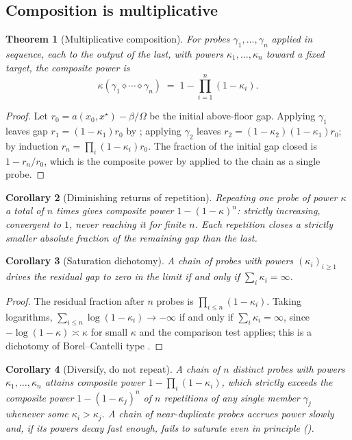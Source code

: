 \documentclass[11pt,twocolumn,a4paper]{article}
\theoremstyle{dirthm}
\newtheorem{theorem}{Theorem}[section]
\newtheorem{corollary}[theorem]{Corollary}
\theoremstyle{definition}
\theoremstyle{remark}
\newcommand{\flo}{\beta}
\newcommand{\al}{a}
\newcommand{\Om}{\Omega}
\newcommand{\pot}{\kappa}
\begin{document}
\subsection{Composition is multiplicative}

\begin{theorem}[Multiplicative composition]
\label{thm:multiplicative}
For probes $\gamma_1,\dots,\gamma_n$ applied in sequence, each to the output
of the last, with powers $\pot_1,\dots,\pot_n$ toward a fixed target, the
composite power is
\[
\pot(\gamma_1\diamond\cdots\diamond\gamma_n)\;=\;1-\prod_{i=1}^{n}(1-\pot_i).
\]
\end{theorem}

\begin{proof}
Let $r_0=\al(x_0,x^{\star})-\flo/\Om$ be the initial above-floor gap.
Applying $\gamma_1$ leaves gap $r_1=(1-\pot_1)r_0$ by ;
applying $\gamma_2$ leaves $r_2=(1-\pot_2)(1-\pot_1)r_0$; by induction
$r_n=\prod_i(1-\pot_i)r_0$. The fraction of the initial gap closed is
$1-r_n/r_0$, which is the composite power by  applied to the
chain as a single probe.
\end{proof}

\begin{corollary}[Diminishing returns of repetition]
\label{cor:diminishing}
Repeating one probe of power $\pot$ a total of $n$ times gives composite power
$1-(1-\pot)^n$: strictly increasing, convergent to $1$, never reaching it for
finite $n$. Each repetition closes a strictly smaller absolute fraction of the
remaining gap than the last.
\end{corollary}

\begin{corollary}[Saturation dichotomy]
\label{cor:saturation}
A chain of probes with powers $(\pot_i)_{i\ge1}$ drives the residual gap to
zero in the limit if and only if $\sum_i\pot_i=\infty$.
\end{corollary}

\begin{proof}
The residual fraction after $n$ probes is $\prod_{i\le n}(1-\pot_i)$. Taking
logarithms, $\sum_{i\le n}\log(1-\pot_i)\to-\infty$ if and only if
$\sum_i\pot_i=\infty$, since $-\log(1-\pot)\asymp\pot$ for small $\pot$ and
the comparison test applies; this is a dichotomy of Borel--Cantelli type
\citep{borel1909,cantelli1917}.
\end{proof}

\begin{corollary}[Diversify, do not repeat]
\label{cor:diversify}
A chain of $n$ distinct probes with powers $\pot_1,\dots,\pot_n$ attains
composite power $1-\prod_i(1-\pot_i)$, which strictly exceeds the composite
power $1-(1-\pot_j)^n$ of $n$ repetitions of any single member $\gamma_j$
whenever some $\pot_i>\pot_j$. A chain of near-duplicate probes accrues power
slowly and, if its powers decay fast enough, fails to saturate even in
principle ().
\end{corollary}
\end{document}
